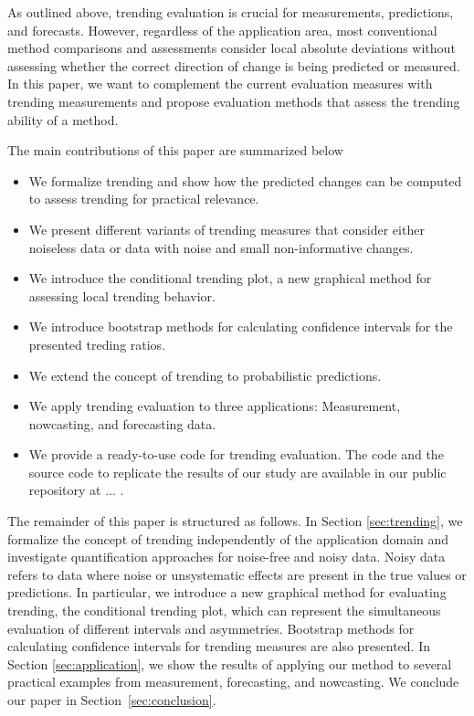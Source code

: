 As outlined above, trending evaluation is crucial for measurements, predictions, and forecasts. 
However, regardless of the application area, most conventional method comparisons and assessments consider local absolute deviations without assessing whether the correct direction of change is being predicted or measured. In this paper, we want to complement the current evaluation measures with trending measurements and propose evaluation methods that assess the trending ability of a method.

The main contributions of this paper are summarized below
\begin{itemize}
\item We formalize trending and show how the predicted changes can be computed to assess trending for practical relevance. 
\item We present different variants of trending measures that consider either noiseless data or data with noise and small non-informative changes.
\item We introduce the conditional trending plot, a new graphical method for assessing local trending behavior.
\item We introduce bootstrap methods for calculating confidence intervals for the presented treding ratios.
\item We extend the concept of trending to probabilistic predictions.
\item We apply trending evaluation to three applications: Measurement, nowcasting, and forecasting data. 
\item We provide a ready-to-use code for trending evaluation. The code and the source code to replicate the results of our study are available in our public repository at ... .
\end{itemize}

The remainder of this paper is structured as follows. 
In Section \ref{sec:trending}, we formalize the concept of trending independently of the application domain and investigate quantification approaches for noise-free and noisy data. Noisy data refers to data where noise or unsystematic effects are present in the true values or predictions.
In particular, we introduce a new graphical method for evaluating trending, the conditional trending plot, which can represent the simultaneous evaluation of different intervals and asymmetries. 
Bootstrap methods for calculating confidence intervals for trending measures are also presented. 
In Section \ref{sec:application}, we show the results of applying our method to several practical examples from measurement, forecasting, and nowcasting. 
We conclude our paper in Section~\ref{sec:conclusion}.
